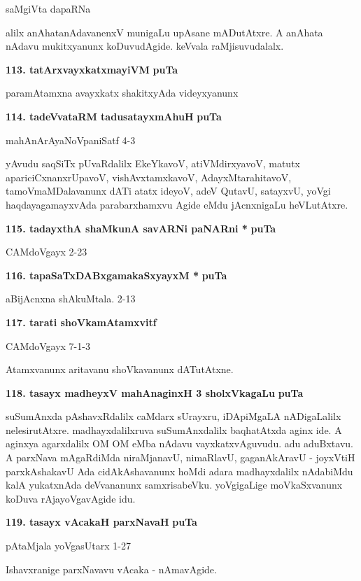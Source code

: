 \hfill{saMgiVta dapaRNa}

\smallskip
alilx anAhatanAdavanenxV munigaLu upAsane mADutAtxre. A anAhata nAdavu mukitxyanunx koDuvu\-dAgide. keVvala raMjisuvudalalx.

\medskip
\noindent
\textbf{113. tatArxvayxkatxmayiVM} \hfill{\bf puTa \pageref{86}}

\smallskip
paramAtamxna avayxkatx shakitxyAda videyxyanunx

\medskip
\noindent
\textbf{114. tadeVvataRM tadusatayxmAhuH} \hfill{\bf puTa \pageref{239}}

\hfill{mahAnArAyaNoVpaniSatf 4-3}

\smallskip
yAvudu saqSiTx pUvaRdalilx EkeYkavoV, atiVMdirxyavoV, matutx apari\-ciCxnanxrUpavoV, vishAvxtamxkavoV, AdayxMtarahitavoV, tamoVmaMDalavanunx dATi atatx ideyoV, adeV QutavU, satayxvU, yoVgi haqdaya\-gamayxvAda parabarxhamxvu Agide eMdu jAcnxnigaLu heVLutAtxre.


\medskip
\noindent
\textbf{115. tadayxthA shaMkunA savARNi paNARni *} \hfill{\bf puTa \pageref{84}}

\hfill{CAMdoVgayx 2-23}

\medskip
\noindent
\textbf{116. tapaSaTxDABxgamakaSxyayxM *} \hfill{\bf puTa \pageref{46}}

\hfill{aBijAcnxna shAkuMtala. 2-13}

\medskip
\noindent
\textbf{117. tarati shoVkamAtamxvitf} \hfill{\bf \pageref{42d}}

\hfill{CAMdoVgayx 7-1-3}

Atamxvanunx aritavanu shoVkavanunx dATutAtxne.

\medskip
\noindent
\textbf{118. tasayx madheyxV mahAnaginxH 3 sholxVkagaLu} \hfill{\bf puTa \pageref{150}}

\smallskip
suSumAnxda pAshavxRdalilx caMdarx sUrayxru, iDApiMgaLA nADigaLalilx nelesiru\-tAtxre. madhayxdalilxruva suSumAnxdalilx  baqhatAtxda aginx ide. A aginxya agarxdalilx OM OM eMba nAdavu vayxkatxvAguvudu. adu aduBxtavu. A parxNava mAgaRdiMda niraMjanavU, nimaRlavU, gaganAkAravU - joyxVtiH parxkAshakavU Ada cidAkAshavanunx hoMdi adara madhayxdalilx nAdabiMdu kalA yukatxnAda deVvananunx samxrisabeVku. yoVgi\-gaLige moVkaSxvanunx koDuva rAjayoVgavAgide idu.

\medskip
\noindent
\textbf{119. tasayx vAcakaH parxNavaH} \hfill{\bf puTa \pageref{147}}

\hfill{pAtaMjala yoVgasUtarx 1-27}

Ishavxranige parxNavavu vAcaka - nAmavAgide.

